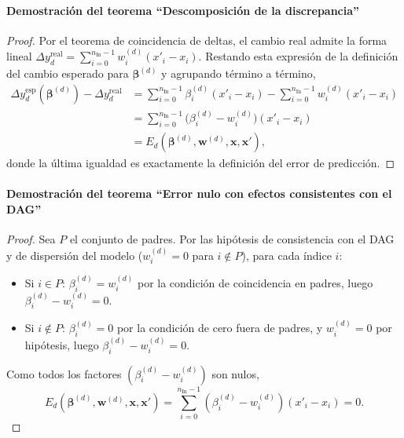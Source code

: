 \documentclass[12pt]{report} %
\begin{document}
\paragraph*{Demostración del teorema ``Descomposición de la discrepancia''}
\begin{proof}
    Por el teorema de coincidencia de deltas, el cambio real admite la forma lineal $\Delta y_d^{\text{real}} = \sum_{i=0}^{n_{\text{In}}-1} w_i^{(d)} (x'_i - x_i)$. Restando esta expresión de la definición del cambio esperado para $\boldsymbol{\beta}^{(d)}$ y agrupando término a término,
    \begin{align*}
        \Delta y_d^{\text{esp}}\!\left(\boldsymbol{\beta}^{(d)}\right) - \Delta y_d^{\text{real}}
         & = \sum_{i=0}^{n_{\text{In}}-1} \beta_i^{(d)} (x'_i - x_i) - \sum_{i=0}^{n_{\text{In}}-1} w_i^{(d)} (x'_i - x_i) \\
         & = \sum_{i=0}^{n_{\text{In}}-1} \bigl(\beta_i^{(d)} - w_i^{(d)}\bigr) (x'_i - x_i)                               \\
         & = E_d(\boldsymbol{\beta}^{(d)}, \mathbf{w}^{(d)}, \mathbf{x}, \mathbf{x}'),
    \end{align*}
    donde la última igualdad es exactamente la definición del error de predicción.
\end{proof}

\paragraph*{Demostración del teorema ``Error nulo con efectos consistentes con el DAG''}
\begin{proof}
    Sea $P$ el conjunto de padres. Por las hipótesis de consistencia con el DAG y de dispersión del modelo ($w_i^{(d)} = 0$ para $i \notin P$), para cada índice $i$:
    \begin{itemize}
        \item Si $i \in P$: $\beta_i^{(d)} = w_i^{(d)}$ por la condición de coincidencia en padres, luego $\beta_i^{(d)} - w_i^{(d)} = 0$.
        \item Si $i \notin P$: $\beta_i^{(d)} = 0$ por la condición de cero fuera de padres, y $w_i^{(d)} = 0$ por hipótesis, luego $\beta_i^{(d)} - w_i^{(d)} = 0$.
    \end{itemize}
    Como todos los factores $(\beta_i^{(d)} - w_i^{(d)})$ son nulos,
    $$E_d(\boldsymbol{\beta}^{(d)}, \mathbf{w}^{(d)}, \mathbf{x}, \mathbf{x}') = \sum_{i=0}^{n_{\text{In}}-1} (\beta_i^{(d)} - w_i^{(d)})(x'_i - x_i) = 0.$$
\end{proof}
\end{document}
